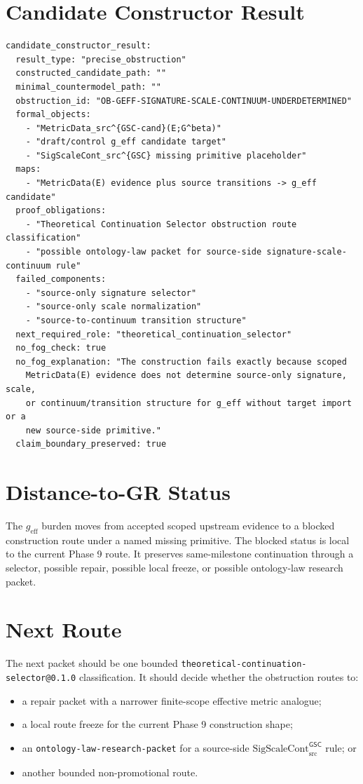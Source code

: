 \documentclass[11pt]{article}
\newcommand{\SigScaleCont}{\mathrm{SigScaleCont}_{\mathrm{src}}^{\mathsf{GSC}}}
\begin{document}
\section{Candidate Constructor Result}

\begin{verbatim}
candidate_constructor_result:
  result_type: "precise_obstruction"
  constructed_candidate_path: ""
  minimal_countermodel_path: ""
  obstruction_id: "OB-GEFF-SIGNATURE-SCALE-CONTINUUM-UNDERDETERMINED"
  formal_objects:
    - "MetricData_src^{GSC-cand}(E;G^beta)"
    - "draft/control g_eff candidate target"
    - "SigScaleCont_src^{GSC} missing primitive placeholder"
  maps:
    - "MetricData(E) evidence plus source transitions -> g_eff candidate"
  proof_obligations:
    - "Theoretical Continuation Selector obstruction route classification"
    - "possible ontology-law packet for source-side signature-scale-continuum rule"
  failed_components:
    - "source-only signature selector"
    - "source-only scale normalization"
    - "source-to-continuum transition structure"
  next_required_role: "theoretical_continuation_selector"
  no_fog_check: true
  no_fog_explanation: "The construction fails exactly because scoped
    MetricData(E) evidence does not determine source-only signature, scale,
    or continuum/transition structure for g_eff without target import or a
    new source-side primitive."
  claim_boundary_preserved: true
\end{verbatim}

\section{Distance-to-GR Status}

The \(g_{\mathrm{eff}}\) burden moves from accepted scoped upstream evidence
to a blocked construction route under a named missing primitive. The blocked
status is local to the current Phase 9 route. It preserves same-milestone
continuation through a selector, possible repair, possible local freeze, or
possible ontology-law research packet.

\section{Next Route}

The next packet should be one bounded
\texttt{theoretical-continuation-selector@0.1.0} classification. It should
decide whether the obstruction routes to:
\begin{itemize}[leftmargin=*]
  \item a repair packet with a narrower finite-scope effective metric analogue;
  \item a local route freeze for the current Phase 9 construction shape;
  \item an \texttt{ontology-law-research-packet} for a source-side
  \(\SigScaleCont\) rule; or
  \item another bounded non-promotional route.
\end{itemize}
\end{document}

